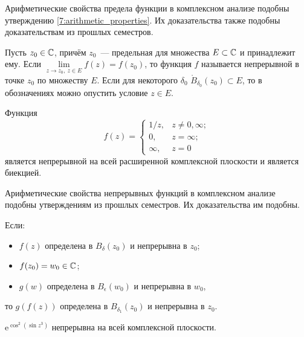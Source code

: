 \begin{note}
Арифметические свойства предела функции в комплексном анализе подобны утверждению
\ref{7:arithmetic_properties}. Их доказательства также подобны доказательствам из прошлых семестров.
\end{note}

\begin{definition}
Пусть \(z_0 \in \mathbb{C}\), причём \(z_0\)~--- предельная для множества \(E \subset \mathbb{C}\) и принадлежит
ему. Если \(\lim\limits_{z \to z_0, \ z \in E} f(z) = f(z_0)\), то функция \(f\) называется
непрерывной в точке \(z_0\) по множеству \(E\). Если для некоторого \(\delta_0\)
\(\mathring{B}_{\delta_0} (z_0) \subset E\), то в обозначениях можно опустить условие \(z \in E\).
\end{definition}

\begin{example}
Функция
\begin{equation*}
    f(z) =
        \begin{cases}
            1/z, & z \neq 0, \infty; \\
            0, & z = \infty; \\
            \infty, & z = 0
        \end{cases}
\end{equation*}
является непрерывной на всей расширенной комплексной плоскости и является биекцией.
\end{example}

\begin{note}
Арифметические свойства непрерывных функций в комплексном анализе подобны утверждениям из прошлых
семестров. Их доказательства им подобны.
\end{note}

\begin{statement}
Если:
\begin{itemize}
\item \(f(z)\) определена в \(B_\delta (z_0)\) и непрерывна в \(z_0\);
\item \(f(z_0) = w_0 \in \mathbb{C}\);
\item \(g(w)\) определена в \(B_\epsilon (w_0)\) и непрерывна в \(w_0\),
\end{itemize}
то \(g(f(z))\) определена в \(B_{\delta_1} (z_0)\) и непрерывна в \(z_0\).
\end{statement}

\begin{example}
\(\text{e}^{\cos^2{(\sin{z^3})}}\) непрерывна на всей комплексной плоскости.
\end{example}

